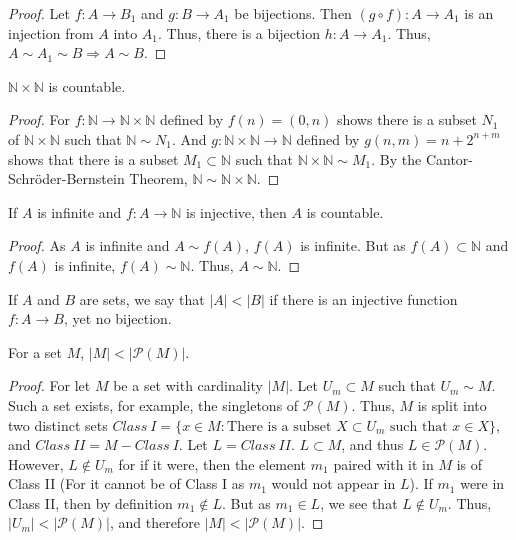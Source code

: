         \begin{proof}
        Let $f:A\rightarrow B_1$ and $g:B\rightarrow A_1$ be bijections.
        Then $(g\circ f):A\rightarrow A_1$ is an injection from $A$ into $A_1$.
        Thus, there is a bijection $h:A\rightarrow A_1$. Thus, $A\sim A_1 \sim B\Rightarrow A\sim B$.
        \end{proof}
        \begin{theorem}
            $\mathbb{N}\times \mathbb{N}$ is countable.
        \end{theorem}
        \begin{proof}
        For $f:\mathbb{N} \rightarrow \mathbb{N}\times \mathbb{N}$ defined by $f(n) = (0,n)$
        shows there is a subset $N_1$ of $\mathbb{N} \times \mathbb{N}$ such that
        $\mathbb{N}\sim N_1$. And $g:\mathbb{N}\times \mathbb{N} \rightarrow \mathbb{N}$
        defined by $g(n,m) =n+2^{n+m}$ shows that there is a subset $M_1 \subset \mathbb{N}$
        such that $\mathbb{N} \times \mathbb{N} \sim M_1$. By the Cantor-Schr\"{o}der-Bernstein Theorem,
        $\mathbb{N} \sim \mathbb{N}\times \mathbb{N}$.
        \end{proof}
        \begin{theorem}
            If $A$ is infinite and $f:A\rightarrow\mathbb{N}$ is injective,
            then $A$ is countable.
        \end{theorem}
        \begin{proof}
        As $A$ is infinite and $A\sim f(A)$, $f(A)$ is infinite.
        But as $f(A)\subset \mathbb{N}$ and $f(A)$ is infinite,
        $f(A)\sim \mathbb{N}$. Thus, $A\sim \mathbb{N}$.
        \end{proof}
        \begin{definition}
            If $A$ and $B$ are sets, we say that $|A|<|B|$ if there is an
            injective function $f:A\rightarrow B$, yet no bijection.
        \end{definition}
        \begin{theorem}
            For a set $M$, $|M|<|\mathcal{P}(M)|$.
        \end{theorem}
        \begin{proof}
        For let $M$ be a set with cardinality $|M|$. Let $U_m \subset M$ such that $U_m \sim M$.
        Such a set exists, for example, the singletons of $\mathcal{P}(M)$. Thus, $M$ is split into
        two distinct sets $Class\ I=\{x\in M: \textrm{There is a subset } X\subset U_m\textrm{ such that }x\in X\}$,
        and $Class\ II=M-Class\ I$. Let $L = Class\ II$. $L\subset M$, and thus $L\in \mathcal{P}(M)$. However,
        $L \notin U_m$ for if it were, then the element $m_1$ paired with it in $M$ is of Class II
        (For it cannot be of Class I as $m_1$ would not appear in $L$). If $m_1$ were in Class II,
        then by definition $m_1 \notin L$. But as $m_1 \in L$, we see that $L\notin U_m$. Thus,
        $|U_m| <|\mathcal{P}(M)|$, and therefore $|M|<|\mathcal{P}(M)|$.
        \end{proof}
